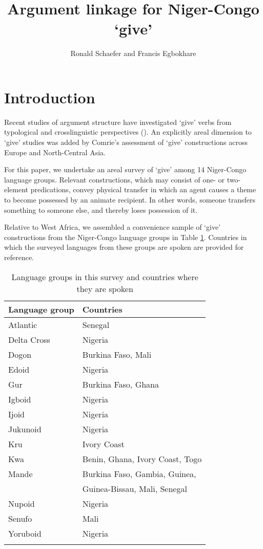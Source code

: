 \documentclass[output=paper,colorlinks,citecolor=brown]{langscibook}
\author{Ronald Schaefer\affiliation{Southern Illinois University Edwardsville} and Francis Egbokhare\affiliation{University of Ibadan}}
\title{Argument linkage for Niger-Congo `give’}
\begin{document}
\maketitle

\section{Introduction}

Recent studies of argument structure have investigated ‘give’ verbs from typological and crosslinguistic perspectives (\citealt{Bouveret2021, Malchukovetal, Newman1996, Newman1998}). An explicitly areal dimension to ‘give’ studies was added by Comrie's \citeyearpar{Comrie2012} assessment of ‘give’ constructions across Europe and North-Central Asia. 

For this paper, we undertake an areal survey of ‘give’ among 14 Niger-Congo language groups. Relevant constructions, which may consist of one- or two-element predications, convey physical transfer in which an agent causes a theme to become possessed by an animate recipient. In other words, someone transfers something to someone else, and thereby loses possession of it. 

Relative to West Africa, we assembled a convenience sample of ‘give’ constructions from the Niger-Congo language groups in Table \ref{tab:Groups}. Countries in which the surveyed languages from these groups are spoken are provided for reference.

\begin{table}
\caption{Language groups in this survey and countries where they are spoken}
\label{tab:Groups}
 \begin{tabular}{ll}
  \lsptoprule
 Language group & Countries \\
 \midrule
 Atlantic & Senegal \\
 Delta Cross & Nigeria \\
 Dogon & Burkina Faso, Mali \\
 Edoid & Nigeria \\
 Gur & Burkina Faso, Ghana \\
 Igboid & Nigeria \\
 Ijoid & Nigeria \\
 Jukunoid & Nigeria \\
 Kru & Ivory Coast \\
 Kwa & Benin, Ghana, Ivory Coast, Togo \\
 Mande & Burkina Faso, Gambia, Guinea, \\
 & Guinea-Bissau, Mali, Senegal \\
 Nupoid & Nigeria \\
 Senufo & Mali\\
 Yoruboid & Nigeria \\
  \lspbottomrule
 \end{tabular}
\end{table}
\end{document}
